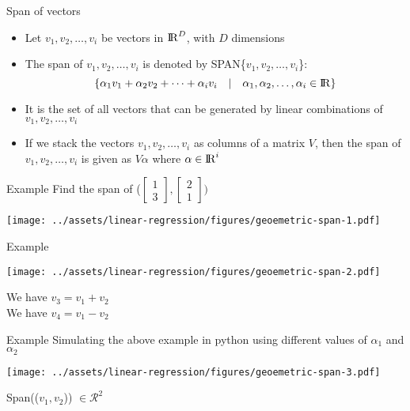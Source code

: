 \documentclass{beamer}
\begin{document}
\begin{frame}{Span of vectors}
\begin{itemize}[<+->]
    \item Let $v_{1},v_{2},\dots,v_{i}$ be vectors in  ${\rm I\!R}^{D}$, with $D$ dimensions
    \item The span of  $v_{1},v_{2},\dots,v_{i}$ is denoted by SPAN\{$v_{1},v_{2},\dots,v_{i} $\}:
        \begin{equation*}
        \{	\alpha_{1}v_{1}+			\alpha_{2}v_{2}+
        \dots+\alpha_{i}v_{i} \hspace{1em}\vert \hspace{1em}  \alpha_{1},\alpha_{2},\dots,\alpha_{i} \in {\rm I\!R}\}
        \end{equation*}
    \item It is the set of all vectors that can be generated by linear combinations of $v_{1},v_{2},\dots,v_{i}$
    \item If we stack the vectors $v_{1},v_{2},\dots,v_{i}$ as columns of a matrix $V$, then the span of $v_{1},v_{2},\dots,v_{i}$ is given as $V\alpha$ where $\alpha \in {\rm I\!R}^{i}$
\end{itemize}
\end{frame}

\begin{frame}{Example}
Find the span of ($\begin{bmatrix}
1 \\3
\end{bmatrix}, \begin{bmatrix}
2 \\1
\end{bmatrix}) $

\texttt{[image: ../assets/linear-regression/figures/geoemetric-span-1.pdf]}



\end{frame}

\begin{frame}{Example}

    \texttt{[image: ../assets/linear-regression/figures/geoemetric-span-2.pdf]}

    We have $v_3 = v_1 + v_2$ \\
    We have $v_4 = v_1 - v_2$ \\


\end{frame}

\begin{frame}{Example}
    Simulating the above example in python using different values of $\alpha_1$ and $\alpha_2$


    \texttt{[image: ../assets/linear-regression/figures/geoemetric-span-3.pdf]}
    
    Span(($v_1, v_2$)) $\in \mathcal{R}^2$
\end{frame}
\end{document}
